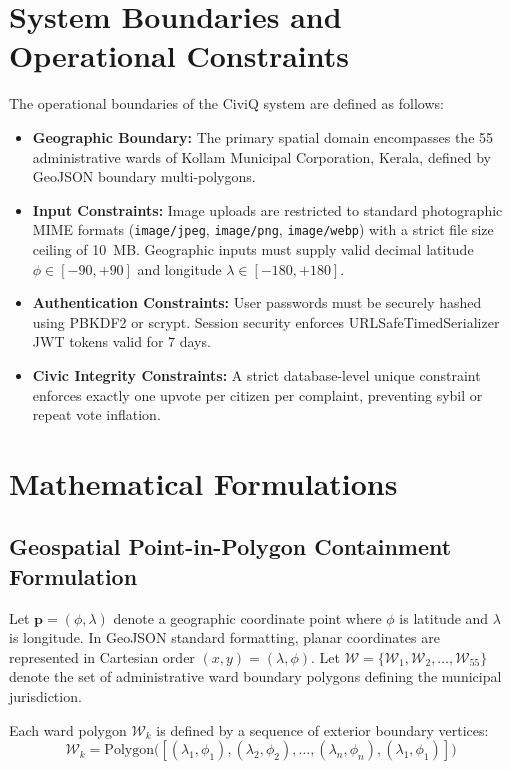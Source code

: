 \documentclass[12pt,a4paper]{report}
\begin{document}
\section{System Boundaries and Operational Constraints}
The operational boundaries of the CiviQ system are defined as follows:
\begin{itemize}
    \item \textbf{Geographic Boundary:} The primary spatial domain encompasses the 55 administrative wards of Kollam Municipal Corporation, Kerala, defined by GeoJSON boundary multi-polygons.
    \item \textbf{Input Constraints:} Image uploads are restricted to standard photographic MIME formats (\texttt{image/jpeg}, \texttt{image/png}, \texttt{image/webp}) with a strict file size ceiling of 10~MB. Geographic inputs must supply valid decimal latitude $\phi \in [-90, +90]$ and longitude $\lambda \in [-180, +180]$.
    \item \textbf{Authentication Constraints:} User passwords must be securely hashed using PBKDF2 or scrypt. Session security enforces URLSafeTimedSerializer JWT tokens valid for 7 days.
    \item \textbf{Civic Integrity Constraints:} A strict database-level unique constraint enforces exactly one upvote per citizen per complaint, preventing sybil or repeat vote inflation.
\end{itemize}

\section{Mathematical Formulations}

\subsection{Geospatial Point-in-Polygon Containment Formulation}
Let $\mathbf{p} = (\phi, \lambda)$ denote a geographic coordinate point where $\phi$ is latitude and $\lambda$ is longitude. In GeoJSON standard formatting, planar coordinates are represented in Cartesian order $(x, y) = (\lambda, \phi)$. Let $\mathcal{W} = \{\mathcal{W}_1, \mathcal{W}_2, \dots, \mathcal{W}_{55}\}$ denote the set of administrative ward boundary polygons defining the municipal jurisdiction.

Each ward polygon $\mathcal{W}_k$ is defined by a sequence of exterior boundary vertices:
\begin{equation}
    \mathcal{W}_k = \mathrm{Polygon}\big( [(\lambda_1, \phi_1), (\lambda_2, \phi_2), \dots, (\lambda_n, \phi_n), (\lambda_1, \phi_1)] \big)
\end{equation}
\end{document}
